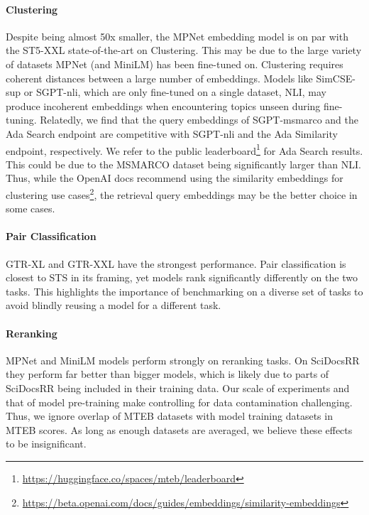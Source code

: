 \documentclass[11pt]{article}
\begin{document}
\paragraph{Clustering} Despite being almost 50x smaller, the MPNet embedding model is on par with the ST5-XXL state-of-the-art on Clustering. This may be due to the large variety of datasets MPNet (and MiniLM) has been fine-tuned on. Clustering requires coherent distances between a large number of embeddings. Models like SimCSE-sup or SGPT-nli, which are only fine-tuned on a single dataset, NLI, may produce incoherent embeddings when encountering topics unseen during fine-tuning. Relatedly, we find that the query embeddings of SGPT-msmarco and the Ada Search endpoint are competitive with SGPT-nli and the Ada Similarity endpoint, respectively. We refer to the public leaderboard\footnote{\url{https://huggingface.co/spaces/mteb/leaderboard}} for Ada Search results. This could be due to the MSMARCO dataset being significantly larger than NLI. Thus, while the OpenAI docs recommend using the similarity embeddings for clustering use cases\footnote{\url{https://beta.openai.com/docs/guides/embeddings/similarity-embeddings}}, the retrieval query embeddings may be the better choice in some cases.

\paragraph{Pair Classification} GTR-XL and GTR-XXL have the strongest performance. Pair classification is closest to STS in its framing, yet models rank significantly differently on the two tasks. This highlights the importance of benchmarking on a diverse set of tasks to avoid blindly reusing a model for a different task.

\paragraph{Reranking} MPNet and MiniLM models perform strongly on reranking tasks. On SciDocsRR \cite{cohan2020specter} they perform far better than bigger models, which is likely due to parts of SciDocsRR being included in their training data. Our scale of experiments and that of model pre-training make controlling for data contamination challenging. Thus, we ignore overlap of MTEB datasets with model training datasets in MTEB scores. As long as enough datasets are averaged, we believe these effects to be insignificant.
\end{document}
